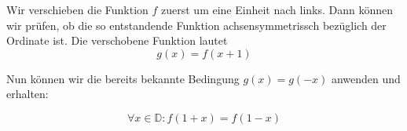\item Wir verschieben die Funktion $f$ zuerst um eine Einheit nach links. Dann können wir prüfen, ob die so entstandende Funktion achsensymmetrissch bezüglich der Ordinate ist. Die verschobene Funktion lautet
  $$g(x) = f(x+1)$$

Nun können wir die bereits bekannte Bedingung  $g(x) = g(-x)$ anwenden und erhalten:

  $$ \forall x \in \mathbb{D}: f(1 + x) = f(1 - x) $$

